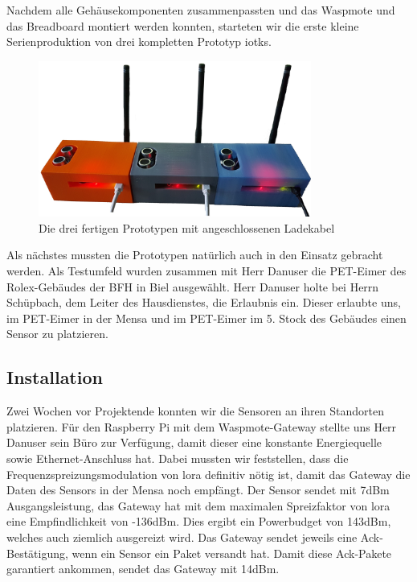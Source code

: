 Nachdem alle Gehäusekomponenten zusammenpassten und das Waspmote und das Breadboard montiert werden konnten, starteten wir die erste kleine Serienproduktion von drei kompletten Prototyp \glspl{iotk}.

\begin{figure}[H]
     \centering
        \includegraphics[width=0.8\textwidth]{pictures/Massproduction.jpg}
    \caption{Die drei fertigen Prototypen mit angeschlossenen Ladekabel}
    \label{fig:3-Prototypes}
\end{figure}

Als nächstes mussten die Prototypen natürlich auch in den Einsatz gebracht werden. Als Testumfeld wurden zusammen mit Herr Danuser die PET-Eimer des Rolex-Gebäudes der BFH in Biel ausgewählt. Herr Danuser holte bei Herrn Schüpbach, dem Leiter des Hausdienstes, die Erlaubnis ein. Dieser erlaubte uns, im PET-Eimer in der Mensa und im PET-Eimer im 5. Stock des Gebäudes einen Sensor zu platzieren.

\subsection*{Installation}
Zwei Wochen vor Projektende konnten wir die Sensoren an ihren Standorten platzieren. Für den Raspberry Pi mit dem Waspmote-Gateway stellte uns Herr Danuser sein Büro zur Verfügung, damit dieser eine konstante Energiequelle sowie Ethernet-Anschluss hat.
Dabei mussten wir feststellen, dass die Frequenzspreizungsmodulation von \gls{lora} definitiv nötig ist, damit das Gateway die Daten des Sensors in der Mensa noch empfängt. Der Sensor sendet mit 7dBm Ausgangsleistung, das Gateway hat mit dem maximalen Spreizfaktor von \gls{lora} eine Empfindlichkeit von -136dBm. Dies ergibt ein Powerbudget von 143dBm, welches auch ziemlich ausgereizt wird. Das Gateway sendet jeweils eine Ack-Bestätigung, wenn ein Sensor ein Paket versandt hat. Damit diese Ack-Pakete garantiert ankommen, sendet das Gateway mit 14dBm.

